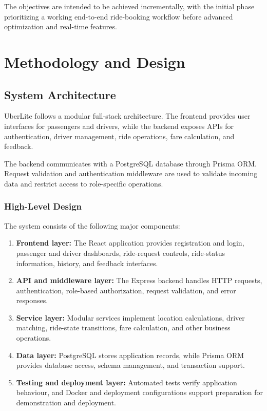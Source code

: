 \documentclass{tietreport}
\begin{document}
The objectives are intended to be achieved incrementally, with
the initial phase prioritizing a working end-to-end ride-booking
workflow before advanced optimization and real-time features.


\chapter{Methodology and Design}

\section{System Architecture}

UberLite follows a modular full-stack architecture. The frontend
provides user interfaces for passengers and drivers, while the
backend exposes APIs for authentication, driver management,
ride operations, fare calculation, and feedback.

The backend communicates with a PostgreSQL database through
Prisma ORM. Request validation and authentication middleware
are used to validate incoming data and restrict access to
role-specific operations.

\subsection{High-Level Design}

The system consists of the following major components:

\begin{enumerate}
    \item \textbf{Frontend layer:}
    The React application provides registration and login,
    passenger and driver dashboards, ride-request controls,
    ride-status information, history, and feedback interfaces.

    \item \textbf{API and middleware layer:}
    The Express backend handles HTTP requests, authentication,
    role-based authorization, request validation, and error
    responses.

    \item \textbf{Service layer:}
    Modular services implement location calculations, driver
    matching, ride-state transitions, fare calculation,
    and other business operations.

    \item \textbf{Data layer:}
    PostgreSQL stores application records, while Prisma ORM
    provides database access, schema management, and
    transaction support.

    \item \textbf{Testing and deployment layer:}
    Automated tests verify application behaviour, and
    Docker and deployment configurations support preparation
    for demonstration and deployment.
\end{enumerate}
\end{document}

